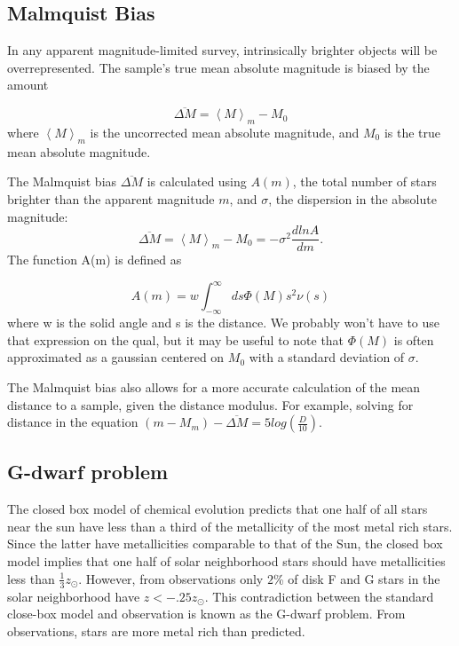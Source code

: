 \subsection{Malmquist Bias}

In any apparent magnitude-limited survey, intrinsically brighter objects will be overrepresented. The sample's true mean absolute magnitude is biased by the amount

\begin{equation}
\overline{\Delta M} = \left<M\right>_m - M_0
\end{equation}
where $\left<M\right>_m $ is the uncorrected mean absolute magnitude, and $M_0$ is the true mean absolute magnitude. 

The Malmquist bias $\overline{\Delta M}$ is calculated using $A(m)$, the total number of stars brighter than the apparent magnitude $m$, and $\sigma$, the dispersion in the absolute magnitude:
\begin{equation}
\overline{\Delta M} = \left<M\right>_m - M_0 = -\sigma^2 \frac{d ln A}{dm}.
\end{equation}
The function A(m) is defined as

\begin{equation}
A(m) = w\int^\infty_{-\infty} ds \Phi(M) s^2 \nu(s)
\end{equation}
where w is the solid angle and s is the distance. We probably won't have to use that expression on the qual, but it may be useful to note that $\Phi(M)$ is often approximated as a gaussian centered on $M_0$ with a standard deviation of $\sigma$. 

The Malmquist bias also allows for a more accurate calculation of the mean distance to a sample, given the distance modulus. For example, solving for distance in the equation $(m-M_m)-\overline{\Delta M} = 5log\left(\frac{D}{10} \right)$.

\subsection{G-dwarf problem}

The closed box model of chemical evolution predicts that one half of all stars near the sun have less than a third of the metallicity of the most metal rich stars.  Since the latter have metallicities comparable to that of the Sun, the closed box model implies that one half of solar neighborhood stars should have metallicities less than $\frac{1}{3}z_\odot$.  However, from observations only $2$\% of disk F and G stars in the solar neighborhood have $z < -.25 z_\odot$.  This contradiction between the standard close-box model and observation is known as the G-dwarf problem.  From observations, stars are more metal rich than predicted.

